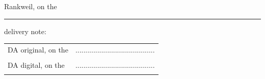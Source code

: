 	\par Rankweil, on the \PrintDate \\		
	
	\noindent\rule{\textwidth}{0.4pt}
	delivery note:
	\linebreak
	
	\begin{tabular}{p{7cm}C{6cm}}
		\hspace{1cm} DA original, on the \PrintDate & ........................................ \\ 
		& \supervisor \\ [2.5em]
		
		\hspace{1cm} DA digital, on the \PrintDate & ........................................ \\ 
		& \supervisor \\
	\end{tabular}
	
	
	\pagebreak
	
	

